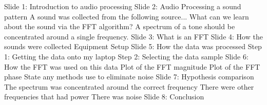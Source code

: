 \documentclass[10pt]{article}
\begin{document}
\begin{outline}[enumerate]
\1 Slide 1: Introduction to audio processing
\1 Slide 2: Audio Processing a sound pattern
\2 A sound was collected from the following source...
\2 What can we learn about the sound via the FFT algorithm?
\2 A spectrum of a tone should be concentrated around a single frequency.
\1 Slide 3: What is an FFT
\1 Slide 4: How the sounds were collected
\2 Equipment
\2 Setup
\1 Slide 5: How the data was processed
\2 Step 1: Getting the data onto my laptop
\2 Step 2: Selecting the data sample
\1 Slide 6: How the FFT was used on this data
\2 Plot of the FFT magnitude
\2 Plot of the FFT phase
\2 State any methods use to eliminate noise
\1 Slide 7: Hypothesis comparison
\2 The spectrum was concentrated around the correct frequency
\2 There were other frequencies that had power
\2 There was noise
\1 Slide 8: Conclusion

\end{outline}
\end{document}
